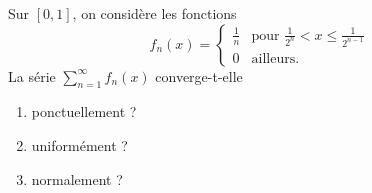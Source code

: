 

\begin{exercice}\label{exo_I-1-10}

Sur $[0,1]$, on considère les fonctions
\begin{equation}
	f_n(x)=
\begin{cases}
	\frac{ 1 }{ n }	&	\text{pour }\frac{ 1 }{ 2^n }<x\leq \frac{ 1 }{ 2^{n-1} }\\
	0	&	 \text{ailleurs.}
\end{cases}
\end{equation}
La série $\sum_{n=1}^{\infty}f_n(x)$ converge-t-elle
\begin{enumerate}
\item ponctuellement ?
\item uniformément ?
\item normalement ?
\end{enumerate}

\end{exercice}
